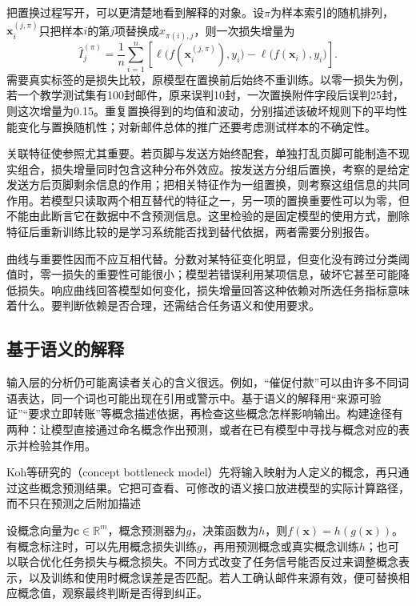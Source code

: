 把置换过程写开，可以更清楚地看到解释的对象。设$\pi$为样本索引的随机排列，$\bm{x}_i^{(j,\pi)}$只把样本$i$的第$j$项替换成$x_{\pi(i),j}$，则一次损失增量为
\begin{equation}
 \widehat I_j^{(\pi)}
 =\frac1n\sum_{i=1}^n\left[
 \ell\bigl(f(\bm{x}_i^{(j,\pi)}),y_i\bigr)
 -\ell\bigl(f(\bm{x}_i),y_i\bigr)\right].
 \label{eq:interpretability-permutation}
\end{equation}
需要真实标签的是损失比较，原模型在置换前后始终不重训练。以零一损失为例，若一个教学测试集有100封邮件，原来误判10封，一次置换附件字段后误判25封，则这次增量为0.15。重复置换得到的均值和波动，分别描述该破坏规则下的平均性能变化与置换随机性；对新邮件总体的推广还要考虑测试样本的不确定性。

关联特征使参照尤其重要。若页脚与发送方始终配套，单独打乱页脚可能制造不现实组合，损失增量同时包含这种分布外效应。按发送方分组后置换，考察的是给定发送方后页脚剩余信息的作用；把相关特征作为一组置换，则考察这组信息的共同作用。若模型只读取两个相互替代的特征之一，另一项的置换重要性可以为零，但不能由此断言它在数据中不含预测信息。这里检验的是固定模型的使用方式，删除特征后重新训练比较的是学习系统能否找到替代依据，两者需要分别报告。

曲线与重要性因而不应互相代替。分数对某特征变化明显，但变化没有跨过分类阈值时，零一损失的重要性可能很小；模型若错误利用某项信息，破坏它甚至可能降低损失。响应曲线回答模型如何变化，损失增量回答这种依赖对所选任务指标意味着什么。要判断依赖是否合理，还需结合任务语义和使用要求。

\subsection{基于语义的解释}
\label{sec:interpretability-global-concepts}

输入层的分析仍可能离读者关心的含义很远。例如，“催促付款”可以由许多不同词语表达，同一个词也可能出现在引用或警示中。基于语义的解释用“来源可验证”“要求立即转账”等概念描述依据，再检查这些概念怎样影响输出。构建途径有两种：让模型直接通过命名概念作出预测，或者在已有模型中寻找与概念对应的表示并检验其作用。

Koh等研究的（concept bottleneck model）先将输入映射为人定义的概念，再只通过这些概念预测结果。它把可查看、可修改的语义接口放进模型的实际计算路径，而不只在预测之后附加描述

设概念向量为$\bm{c}\in\mathbb R^m$，概念预测器为$g$，决策函数为$h$，则$f(\bm{x})=h(g(\bm{x}))$。有概念标注时，可以先用概念损失训练$g$，再用预测概念或真实概念训练$h$；也可以联合优化任务损失与概念损失。不同方式改变了任务信号能否反过来调整概念表示，以及训练和使用时概念误差是否匹配。若人工确认邮件来源有效，便可替换相应概念值，观察最终判断是否得到纠正。

